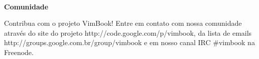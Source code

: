 
\begin{center}
\begin{Huge}~\\[10mm]\textbf{{Comunidade}}\\[20mm]\end{Huge}
{}
\end{center}

Contribua com o projeto VimBook! Entre em contato com nossa comunidade através do site do projeto http://code.google.com/p/vimbook, da lista de emails http://groups.google.com.br/group/vimbook e em nosso canal IRC \#vimbook na Freenode.
